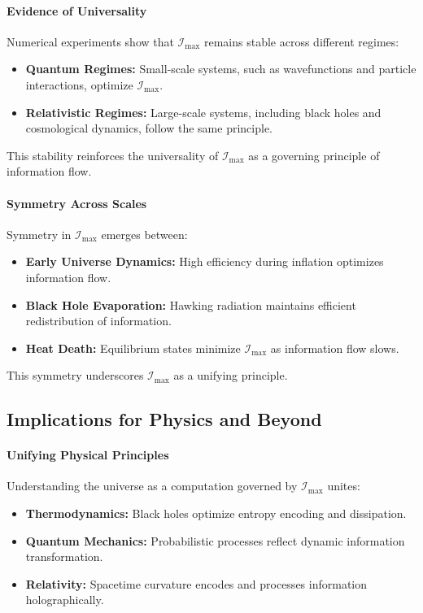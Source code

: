 \documentclass[12pt]{article}
\begin{document}
\paragraph{Evidence of Universality}
Numerical experiments show that \(\mathcal{I}_{\text{max}}\) remains stable across different regimes:
\begin{itemize}
    \item \textbf{Quantum Regimes:} Small-scale systems, such as wavefunctions and particle interactions, optimize \(\mathcal{I}_{\text{max}}\).
    \item \textbf{Relativistic Regimes:} Large-scale systems, including black holes and cosmological dynamics, follow the same principle.
\end{itemize}
This stability reinforces the universality of \(\mathcal{I}_{\text{max}}\) as a governing principle of information flow.

\paragraph{Symmetry Across Scales}
Symmetry in \(\mathcal{I}_{\text{max}}\) emerges between:
\begin{itemize}
    \item \textbf{Early Universe Dynamics:} High efficiency during inflation optimizes information flow.
    \item \textbf{Black Hole Evaporation:} Hawking radiation maintains efficient redistribution of information.
    \item \textbf{Heat Death:} Equilibrium states minimize \(\mathcal{I}_{\text{max}}\) as information flow slows.
\end{itemize}
This symmetry underscores \(\mathcal{I}_{\text{max}}\) as a unifying principle.

\subsection{Implications for Physics and Beyond}

\paragraph{Unifying Physical Principles}
Understanding the universe as a computation governed by \(\mathcal{I}_{\text{max}}\) unites:
\begin{itemize}
    \item \textbf{Thermodynamics:} Black holes optimize entropy encoding and dissipation.
    \item \textbf{Quantum Mechanics:} Probabilistic processes reflect dynamic information transformation.
    \item \textbf{Relativity:} Spacetime curvature encodes and processes information holographically.
\end{itemize}
\end{document}
